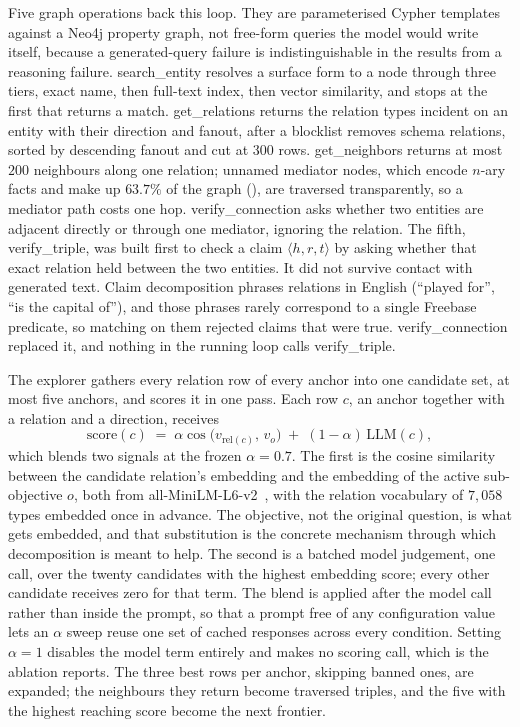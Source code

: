 Five graph operations back this loop. They are parameterised Cypher
templates against a Neo4j property graph, not free-form queries the
model would write itself, because a generated-query failure is
indistinguishable in the results from a reasoning failure.
\textsf{search\_entity} resolves a surface form to a node through three
tiers, exact name, then full-text index, then vector similarity, and
stops at the first that returns a match. \textsf{get\_relations} returns
the relation types incident on an entity with their direction and
fanout, after a blocklist removes schema relations, sorted by descending
fanout and cut at $300$ rows. \textsf{get\_neighbors} returns at most
$200$ neighbours along one relation; unnamed mediator nodes, which
encode $n$-ary facts and make up $63.7\%$ of the graph
(), are traversed transparently, so a mediator
path costs one hop. \textsf{verify\_connection} asks whether two
entities are adjacent directly or through one mediator, ignoring the
relation. The fifth, \textsf{verify\_triple}, was built first to check a
claim $\langle h, r, t \rangle$ by asking whether that exact relation
held between the two entities. It did not survive contact with generated
text. Claim decomposition phrases relations in English (``played for'',
``is the capital of''), and those phrases rarely correspond to a single
Freebase predicate, so matching on them rejected claims that were true.
\textsf{verify\_connection} replaced it, and nothing in the running loop
calls \textsf{verify\_triple}.

The explorer gathers every relation row of every anchor into one
candidate set, at most five anchors, and scores it in one pass. Each row
$c$, an anchor together with a relation and a direction, receives
\begin{equation}\label{eq:score}
  \mathrm{score}(c) \;=\; \alpha \cos\!\big(v_{\mathrm{rel}(c)},\,
  v_{o}\big) \;+\; (1-\alpha)\, \mathrm{LLM}(c),
\end{equation}
which blends two signals at the frozen $\alpha = 0.7$. The first is the
cosine similarity between the candidate relation's embedding and the
embedding of the active sub-objective $o$, both from
\textsf{all-MiniLM-L6-v2}~\cite{reimers2019sentence}, with the relation
vocabulary of $7{,}058$ types embedded once in advance. The objective,
not the original question, is what gets embedded, and that substitution
is the concrete mechanism through which decomposition is meant to help.
The second is a batched model judgement, one call, over the twenty
candidates with the highest embedding score; every other candidate
receives zero for that term. The blend is applied after the model call
rather than inside the prompt, so that a prompt free of any configuration
value lets an $\alpha$ sweep reuse one set of cached responses across
every condition. Setting $\alpha = 1$ disables the model term entirely
and makes no scoring call, which is the ablation 
reports. The three best rows per anchor, skipping banned ones, are
expanded; the neighbours they return become traversed triples, and the
five with the highest reaching score become the next frontier.

